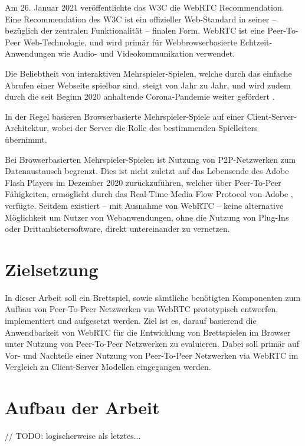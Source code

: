 Am 26. Januar 2021 veröffentlichte das \ac{W3C} die \ac{WebRTC} Recommendation. Eine Recommendation des \acs{W3C} ist ein offizieller Web-Standard in seiner -- bezüglich der zentralen Funktionalität -- finalen Form. \acs{WebRTC} ist eine Peer-To-Peer Web-Technologie, und wird primär für Webbrowserbasierte Echtzeit-Anwendungen wie Audio- und Videokommunikation verwendet.\par

Die Beliebtheit von interaktiven Mehrspieler-Spielen, welche durch das einfache Abrufen einer Webseite spielbar sind, steigt von Jahr zu Jahr, und wird zudem durch die seit Beginn 2020 anhaltende Corona-Pandemie weiter gefördert \cite{BGMarket}.\par

In der Regel basieren Browserbasierte Mehrspieler-Spiele auf einer Client-Server-Architektur, wobei der Server die Rolle des bestimmenden Spielleiters übernimmt.\par

Bei Browserbasierten Mehrspieler-Spielen ist Nutzung von \acf{P2P}-Netzwerken zum Datenaustausch  begrenzt. Dies ist nicht zuletzt auf das Lebensende des Adobe Flash Players im Dezember 2020 zurückzuführen, welcher über Peer-To-Peer Fähigkeiten, ermöglicht durch das Real-Time Media Flow Protocol von Adobe \cite{adobeRFC}, verfügte. Seitdem existiert -- mit Ausnahme von \acs{WebRTC} -- keine alternative Möglichkeit um Nutzer von Webanwendungen, ohne die Nutzung von Plug-Ins oder Drittanbietersoftware, direkt untereinander zu vernetzen.\par

\section{Zielsetzung}
In dieser Arbeit soll ein Brettspiel, sowie sämtliche benötigten Komponenten zum Aufbau von Peer-To-Peer Netzwerken via \acs{WebRTC} prototypisch entworfen, implementiert und aufgesetzt werden. Ziel ist es, darauf basierend die Anwendbarkeit von \acs{WebRTC} für die Entwicklung von Brettspielen im Browser unter Nutzung von Peer-To-Peer Netzwerken zu evaluieren. Dabei soll primär auf Vor- und Nachteile einer Nutzung von Peer-To-Peer Netzwerken via \acs{WebRTC} im Vergleich zu Client-Server Modellen eingegangen werden.

\section{Aufbau der Arbeit}
// TODO: logischerweise als letztes...
